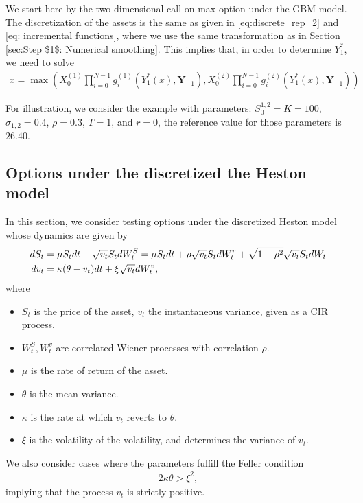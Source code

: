 We start here by the two dimensional call on max option under the GBM model. The discretization of the assets is the same as given in  \eqref{eq:discrete_rep_2} and \eqref{eq: incremental functions}, where we use the same transformation as in Section \ref{sec:Step $1$: Numerical smoothing}. This implies that, in order to determine $Y^{\ast}_1$, we need to solve
\begin{align}
	x=\max\left(X_0^{(1)}  \prod_{i=0}^{N-1} g_i^{(1)}(Y^{\ast}_1(x),\mathbf{Y}_{-1}),X_0^{(2)}  \prod_{i=0}^{N-1} g_i^{(2)}(Y^{\ast}_1(x),\mathbf{Y}_{-1})\right)
\end{align}


For illustration, we consider the example with parameters:  $S_0^{1,2}=K=100$, $\sigma_{1,2}=0.4$, $\rho=0.3$, $T=1$, and  $r=0$, the reference value for those parameters  is  $26.40$.




\subsection{Options under the discretized the Heston model}
In this section, we consider  testing options under the discretized Heston model \cite{heston1993closed,broadie2006exact,kahl2006fast,andersen2007efficient} whose dynamics are given by
\begin{align}\label{eq:dynamics Heston}
dS_t&=\mu S_t dt+\sqrt{v_t}S_t dW_t^S= \mu S_t dt+ \rho\sqrt{v_t}S_t dW_t^v+ \sqrt{1-\rho^2} \sqrt{v_t}S_t dW_t \nonumber\\
dv_t&=\kappa (\theta-v_t)dt+\xi \sqrt{v_t} dW_t^v,
\end{align}
where 

\begin{itemize}
\item $S_t$ is the price of the asset, $v_t$ the instantaneous variance, given as  a CIR process.
\item $W_{t}^{S},W_{t}^{v}$ are correlated Wiener processes with correlation $\rho$.
\item $\mu$  is the rate of return of the asset.
\item $\theta$ is  the mean  variance.
\item $\kappa$ is the rate at which $v_t$ reverts to $\theta$.
\item $\xi$ is the volatility of the volatility, and determines the variance of $v_t$.
\end{itemize}
We also consider cases where the parameters fulfill the Feller condition
\begin{align*}
2 \kappa \theta >\xi^2,
\end{align*}
implying  that the process $v_t$ is strictly positive.


